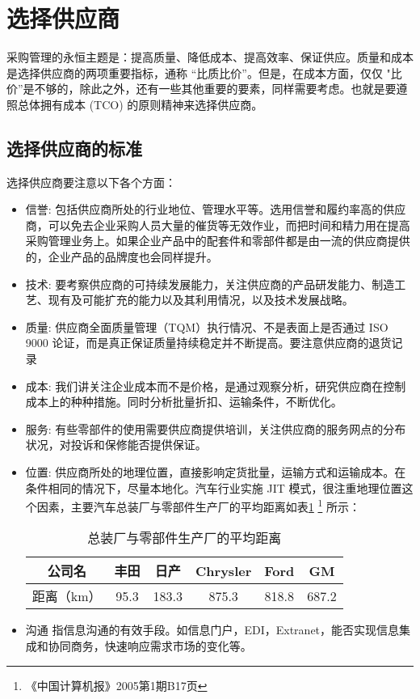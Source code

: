 \section {选择供应商}
    采购管理的永恒主题是：提高质量、降低成本、提高效率、保证供应。质量和成本是选择供应商的两项重要指标，通称 “比质比价”。但是，在成本方面，仅仅 "比价”是不够的，除此之外，还有一些其他重要的要素，同样需要考虑。也就是要遵照总体拥有成本 (TCO) 的原则精神来选择供应商。

\subsection {选择供应商的标准}

    选择供应商要注意以下各个方面：

    \begin{itemize}
        \item 信誉: 包括供应商所处的行业地位、管理水平等。选用信誉和履约率高的供应商，可以免去企业采购人员大量的催货等无效作业，而把时间和精力用在提高采购管理业务上。如果企业产品中的配套件和零部件都是由一流的供应商提供的，企业产品的品牌度也会同样提升。

        \item 技术: 要考察供应商的可持续发展能力，关注供应商的产品研发能力、制造工艺、现有及可能扩充的能力以及其利用情况，以及技术发展战略。

        \item 质量: 供应商全面质量管理（TQM）执行情况、不是表面上是否通过 ISO 9000 论证，而是真正保证质量持续稳定并不断提高。要注意供应商的退货记录

        \item 成本: 我们讲关注企业成本而不是价格，是通过观察分析，研究供应商在控制成本上的种种措施。同时分析批量折扣、运输条件，不断优化。

        \item 服务: 有些零部件的使用需要供应商提供培训，关注供应商的服务网点的分布状况，对投诉和保修能否提供保证。

        \item 位置: 供应商所处的地理位置，直接影响定货批量，运输方式和运输成本。在条件相同的情况下，尽量本地化。汽车行业实施 JIT 模式，很注重地理位置这个因素，主要汽车总装厂与零部件生产厂的平均距离如表\ref{tab:avgdist}
            \footnote {《中国计算机报》2005第1期B17页} 所示：

        \begin{table}[h]
            \centering
            \caption{总装厂与零部件生产厂的平均距离} \label{tab:avgdist}
            \begin{tabular}{|c|c|c|c|c|c|}
                \hline
                公司名 & 丰田 & 日产 & Chrysler & Ford & GM \\ \hline
                距离（km） & 95.3 & 183.3 & 875.3 & 818.8 & 687.2 \\ \hline
            \end{tabular}
        \end{table}

        \item 沟通 指信息沟通的有效手段。如信息门户，EDI，Extranet，能否实现信息集成和协同商务，快速响应需求市场的变化等。

    \end{itemize}

